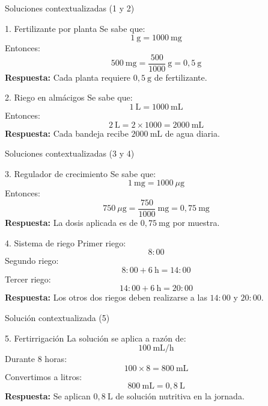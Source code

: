 \documentclass[handout,aspectratio=169,10pt]{beamer}
\begin{document}
	\begin{frame}{Soluciones contextualizadas (1 y 2)}
		\small
		\begin{block}{1. Fertilizante por planta}
			Se sabe que:
			\[
			1\ \text{g} = 1000\ \text{mg}
			\]
			\pause
			Entonces:
			\[
			500\ \text{mg}=\frac{500}{1000}\ \text{g}=0{,}5\ \text{g}
			\]
			\pause
			\textbf{Respuesta:}
			Cada planta requiere \(\boxed{0{,}5\ \text{g}}\) de fertilizante.
		\end{block}
		
		\pause
		\begin{block}{2. Riego en almácigos}
			Se sabe que:
			\[
			1\ \text{L} = 1000\ \text{mL}
			\]
			\pause
			Entonces:
			\[
			2\ \text{L}=2\times 1000=2000\ \text{mL}
			\]
			\pause
			\textbf{Respuesta:}
			Cada bandeja recibe \(\boxed{2000\ \text{mL}}\) de agua diaria.
		\end{block}
	\end{frame}
	
	\begin{frame}{Soluciones contextualizadas (3 y 4)}
		\small
		\begin{block}{3. Regulador de crecimiento}
			Se sabe que:
			\[
			1\ \text{mg} = 1000\ \mu\text{g}
			\]
			\pause
			Entonces:
			\[
			750\ \mu\text{g}=\frac{750}{1000}\ \text{mg}=0{,}75\ \text{mg}
			\]
			\pause
			\textbf{Respuesta:}
			La dosis aplicada es de \(\boxed{0{,}75\ \text{mg}}\) por muestra.
		\end{block}
		
		\pause
		\begin{block}{4. Sistema de riego}
			Primer riego:
			\[
			8{:}00
			\]
			\pause
			Segundo riego:
			\[
			8{:}00 + 6\ \text{h} = 14{:}00
			\]
			\pause
			Tercer riego:
			\[
			14{:}00 + 6\ \text{h} = 20{:}00
			\]
			\pause
			\textbf{Respuesta:}
			Los otros dos riegos deben realizarse a las \(\boxed{14{:}00}\) y \(\boxed{20{:}00}\).
		\end{block}
	\end{frame}
	
	\begin{frame}{Solución contextualizada (5)}
		\small
		\begin{block}{5. Fertirrigación}
			La solución se aplica a razón de:
			\[
			100\ \text{mL/h}
			\]
			Durante \(8\) horas:
			\[
			100 \times 8 = 800\ \text{mL}
			\]
			\pause
			Convertimos a litros:
			\[
			800\ \text{mL} = 0{,}8\ \text{L}
			\]
			\pause
			\textbf{Respuesta:}
			Se aplican \(\boxed{0{,}8\ \text{L}}\) de solución nutritiva en la jornada.
		\end{block}
	\end{frame}
	
\end{document}
